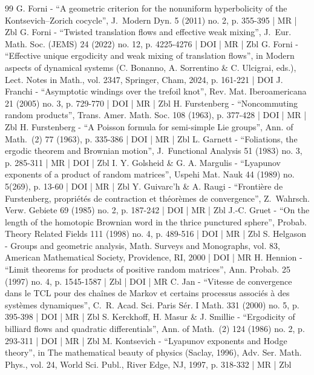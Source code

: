 \documentclass[10pt]{amsart}
\theoremstyle{plain}
\theoremstyle{definition}
\numberwithin{equation}{subsection}
\begin{document}
\begin{thebibliography}{99}
G. Forni - “A geometric criterion for the nonuniform hyperbolicity of the Kontsevich–Zorich cocycle”, J. Modern Dyn. 5 (2011) no. 2, p. 355-395 | MR | Zbl
G. Forni - “Twisted translation flows and effective weak mixing”, J. Eur. Math. Soc. (JEMS) 24 (2022) no. 12, p. 4225-4276 | DOI | MR | Zbl
G. Forni - “Effective unique ergodicity and weak mixing of translation flows”, in Modern aspects of dynamical systems (C. Bonanno, A. Sorrentino \& C. Ulcigrai, eds.), Lect. Notes in Math., vol. 2347, Springer, Cham, 2024, p. 161-221 | DOI
J. Franchi - “Asymptotic windings over the trefoil knot”, Rev. Mat. Iberoamericana 21 (2005) no. 3, p. 729-770 | DOI | MR | Zbl
H. Furstenberg - “Noncommuting random products”, Trans. Amer. Math. Soc. 108 (1963), p. 377-428 | DOI | MR | Zbl
H. Furstenberg - “A Poisson formula for semi-simple Lie groups”, Ann. of Math. (2) 77 (1963), p. 335-386 | DOI | MR | Zbl
L. Garnett - “Foliations, the ergodic theorem and Brownian motion”, J. Functional Analysis 51 (1983) no. 3, p. 285-311 | MR | DOI | Zbl
I. Y. Golsheid \& G. A. Margulis - “Lyapunov exponents of a product of random matrices”, Uspehi Mat. Nauk 44 (1989) no. 5(269), p. 13-60 | DOI | MR | Zbl
Y. Guivarc’h \& A. Raugi - “Frontière de Furstenberg, propriétés de contraction et théorèmes de convergence”, Z. Wahrsch. Verw. Gebiete 69 (1985) no. 2, p. 187-242 | DOI | MR | Zbl
J.-C. Gruet - “On the length of the homotopic Brownian word in the thrice punctured sphere”, Probab. Theory Related Fields 111 (1998) no. 4, p. 489-516 | DOI | MR | Zbl
S. Helgason - Groups and geometric analysis, Math. Surveys and Monographs, vol. 83, American Mathematical Society, Providence, RI, 2000 | DOI | MR
H. Hennion - “Limit theorems for products of positive random matrices”, Ann. Probab. 25 (1997) no. 4, p. 1545-1587 | Zbl | DOI | MR
C. Jan - “Vitesse de convergence dans le TCL pour des chaînes de Markov et certains processus associés à des systèmes dynamiques”, C. R. Acad. Sci. Paris Sér. I Math. 331 (2000) no. 5, p. 395-398 | DOI | MR | Zbl
S. Kerckhoff, H. Masur \& J. Smillie - “Ergodicity of billiard flows and quadratic differentials”, Ann. of Math. (2) 124 (1986) no. 2, p. 293-311 | DOI | MR | Zbl
M. Kontsevich - “Lyapunov exponents and Hodge theory”, in The mathematical beauty of physics (Saclay, 1996), Adv. Ser. Math. Phys., vol. 24, World Sci. Publ., River Edge, NJ, 1997, p. 318-332 | MR | Zbl

\end{thebibliography}
\end{document}

